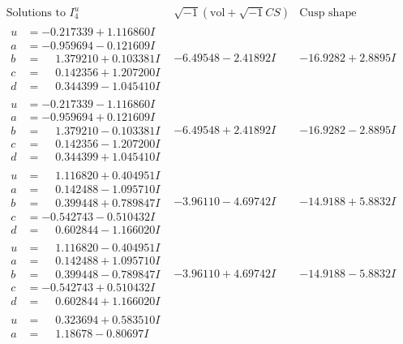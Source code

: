 \documentclass[1p]{elsarticle_modified}
\theoremstyle{definition}
\newcommand{\I}{\sqrt{-1}}
\begin{document}
$$\begin{array}{c|c|c}  
\text{Solutions to }I^u_{4}& \I (\text{vol} + \sqrt{-1}CS) & \text{Cusp shape}\\
 \hline 
\begin{aligned}
u &= -0.217339 + 1.116860 I \\
a &= -0.959694 - 0.121609 I \\
b &= \phantom{-}1.379210 + 0.103381 I \\
c &= \phantom{-}0.142356 + 1.207200 I \\
d &= \phantom{-}0.344399 - 1.045410 I\end{aligned}
 & -6.49548 - 2.41892 I & -16.9282 + 2.8895 I \\ \hline\begin{aligned}
u &= -0.217339 - 1.116860 I \\
a &= -0.959694 + 0.121609 I \\
b &= \phantom{-}1.379210 - 0.103381 I \\
c &= \phantom{-}0.142356 - 1.207200 I \\
d &= \phantom{-}0.344399 + 1.045410 I\end{aligned}
 & -6.49548 + 2.41892 I & -16.9282 - 2.8895 I \\ \hline\begin{aligned}
u &= \phantom{-}1.116820 + 0.404951 I \\
a &= \phantom{-}0.142488 - 1.095710 I \\
b &= \phantom{-}0.399448 + 0.789847 I \\
c &= -0.542743 - 0.510432 I \\
d &= \phantom{-}0.602844 - 1.166020 I\end{aligned}
 & -3.96110 - 4.69742 I & -14.9188 + 5.8832 I \\ \hline\begin{aligned}
u &= \phantom{-}1.116820 - 0.404951 I \\
a &= \phantom{-}0.142488 + 1.095710 I \\
b &= \phantom{-}0.399448 - 0.789847 I \\
c &= -0.542743 + 0.510432 I \\
d &= \phantom{-}0.602844 + 1.166020 I\end{aligned}
 & -3.96110 + 4.69742 I & -14.9188 - 5.8832 I \\ \hline\begin{aligned}
u &= \phantom{-}0.323694 + 0.583510 I \\
a &= \phantom{-}1.18678 - 0.80697 I \\

\end{aligned}
\end{array}$$
\end{document}

